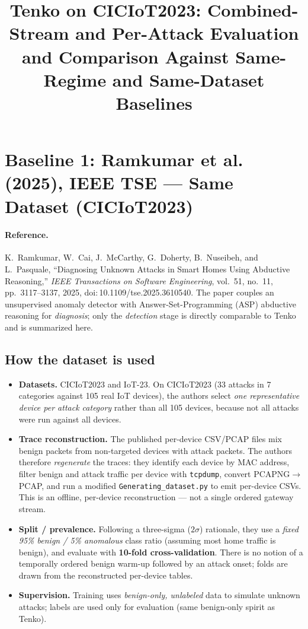 \documentclass[10pt]{article}
\title{\vspace{-2em}Tenko on CICIoT2023: Combined-Stream and Per-Attack Evaluation \\[2pt]
\large and Comparison Against Same-Regime and Same-Dataset Baselines}
\author{}
\date{}
\begin{document}
\maketitle
\vspace{-3em}

\section{Baseline 1: Ramkumar et al. (2025), IEEE TSE --- Same Dataset (CICIoT2023)}
\label{sec:ramkumar}

\paragraph{Reference.} K.~Ramkumar, W.~Cai, J.~McCarthy, G.~Doherty, B.~Nuseibeh, and
L.~Pasquale, ``Diagnosing Unknown Attacks in Smart Homes Using Abductive Reasoning,''
\emph{IEEE Transactions on Software Engineering}, vol.~51, no.~11, pp.~3117--3137, 2025,
doi:\,10.1109/tse.2025.3610540. The paper couples an unsupervised anomaly detector with
Answer-Set-Programming (ASP) abductive reasoning for \emph{diagnosis}; only the
\emph{detection} stage is directly comparable to Tenko and is summarized here.

\subsection{How the dataset is used}
\begin{itemize}
\item \textbf{Datasets.} CICIoT2023 and IoT-23. On CICIoT2023 (33 attacks in 7 categories
against 105 real IoT devices), the authors select \emph{one representative device per
attack category} rather than all 105 devices, because not all attacks were run against all
devices.
\item \textbf{Trace reconstruction.} The published per-device CSV/PCAP files mix benign
packets from non-targeted devices with attack packets. The authors therefore
\emph{regenerate} the traces: they identify each device by MAC address, filter benign and
attack traffic per device with \texttt{tcpdump}, convert PCAPNG$\rightarrow$PCAP, and run a
modified \texttt{Generating\_dataset.py} to emit per-device CSVs. This is an offline,
per-device reconstruction --- not a single ordered gateway stream.
\item \textbf{Split / prevalence.} Following a three-sigma ($2\sigma$) rationale, they use a
\emph{fixed 95\% benign / 5\% anomalous} class ratio (assuming most home traffic is benign),
and evaluate with \textbf{10-fold cross-validation}. There is no notion of a temporally
ordered benign warm-up followed by an attack onset; folds are drawn from the reconstructed
per-device tables.
\item \textbf{Supervision.} Training uses \emph{benign-only, unlabeled} data to simulate
unknown attacks; labels are used only for evaluation (same benign-only spirit as Tenko).
\end{itemize}
\end{document}
